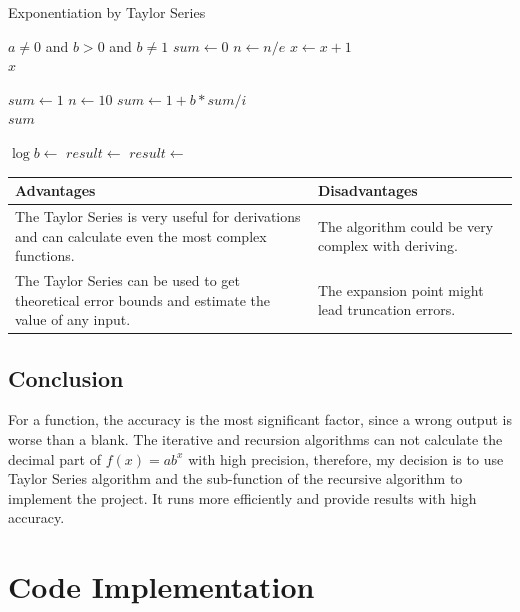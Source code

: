 \documentclass[11pt]{article}
\begin{document}
\begin{algorithm}
\caption{Exponentiation by Taylor Series\cite{Anu:Stack_Overflow}}\label{exp1}
\begin{algorithmic}[1]
\Require $a \neq 0$ and $b > 0$ and $b \neq 1$ 
\State $sum\gets 0$
    \State $n\gets n/e$
    \State $x \gets x + 1 $
\EndWhile \\
\Return $x$
\EndFunction

\State $sum\gets 1$
\State $n\gets 10$
\State $sum\gets 1+ b * sum / i$
\EndFor \\
\Return $sum$
\EndFunction

\State $\log b \gets $
\State $result \gets $
\State $result \gets $
\end{algorithmic}
\end{algorithm}

\begin{center}
    \begin{tabular}{|p{7cm}|p{7cm}|}\hline
        \textbf{Advantages} & \textbf{Disadvantages}\\\hline
        The Taylor Series is very useful for derivations and can calculate even the most complex functions. & The algorithm could be very complex with deriving.\\\hline The Taylor Series can be used to get theoretical error bounds and estimate the value of any input\cite{hariharan2010comparative}.  & The expansion point might lead truncation errors.\\\hline
    \end{tabular}
\end{center}
\subsection{Conclusion}
For a function, the accuracy is the most significant factor, since a wrong output is worse than a blank. The iterative and recursion algorithms can not calculate the decimal part of $f(x) = ab^x$ with high precision, therefore, my decision is to use Taylor Series algorithm and the sub-function of the recursive algorithm to implement the project. It  runs more efficiently and provide results with high accuracy.

\section{Code Implementation}
\end{document}
